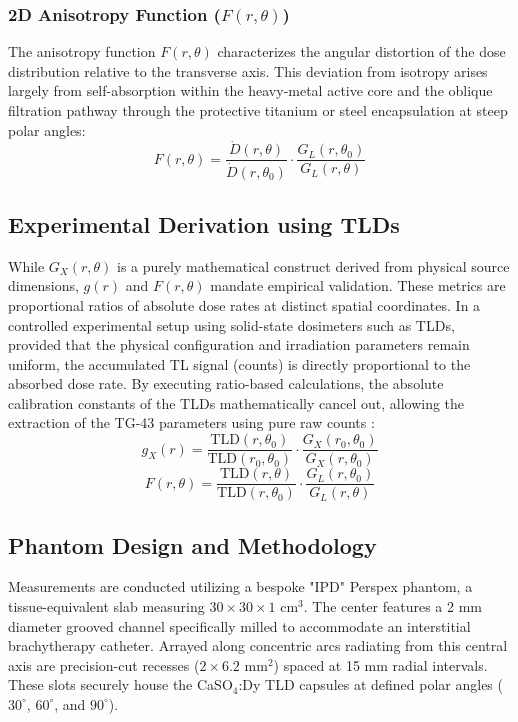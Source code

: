 \subsubsection{2D Anisotropy Function ($F(r, \theta)$)}
The anisotropy function $F(r, \theta)$ characterizes the angular distortion of the dose distribution relative to the transverse axis. This deviation from isotropy arises largely from self-absorption within the heavy-metal active core and the oblique filtration pathway through the protective titanium or steel encapsulation at steep polar angles:
\begin{equation}
F(r, \theta) = \frac{\dot{D}(r, \theta)}{\dot{D}(r, \theta_0)} \cdot \frac{G_L(r, \theta_0)}{G_L(r, \theta)}
\end{equation}

\subsection{Experimental Derivation using TLDs}
While $G_X(r,\theta)$ is a purely mathematical construct derived from physical source dimensions, $g(r)$ and $F(r, \theta)$ mandate empirical validation. These metrics are proportional ratios of absolute dose rates at distinct spatial coordinates. 
In a controlled experimental setup using solid-state dosimeters such as TLDs, provided that the physical configuration and irradiation parameters remain uniform, the accumulated TL signal (counts) is directly proportional to the absorbed dose rate.
By executing ratio-based calculations, the absolute calibration constants of the TLDs mathematically cancel out, allowing the extraction of the TG-43 parameters using pure raw counts \cite{rivard2004update}:
\begin{equation}
g_X(r) = \frac{\text{TLD}(r, \theta_0)}{\text{TLD}(r_0, \theta_0)} \cdot \frac{G_X(r_0, \theta_0)}{G_X(r, \theta_0)}
\end{equation}
\begin{equation}
F(r, \theta) = \frac{\text{TLD}(r, \theta)}{\text{TLD}(r, \theta_0)} \cdot \frac{G_L(r, \theta_0)}{G_L(r, \theta)}
\end{equation}

\subsection{Phantom Design and Methodology}
Measurements are conducted utilizing a bespoke "IPD" Perspex phantom, a tissue-equivalent slab measuring $30 \times 30 \times 1$ cm$^3$. The center features a 2 mm diameter grooved channel specifically milled to accommodate an interstitial brachytherapy catheter. Arrayed along concentric arcs radiating from this central axis are precision-cut recesses ($2 \times 6.2$ mm$^2$) spaced at 15 mm radial intervals. These slots securely house the CaSO$_4$:Dy TLD capsules at defined polar angles ($30^\circ$, $60^\circ$, and $90^\circ$).

